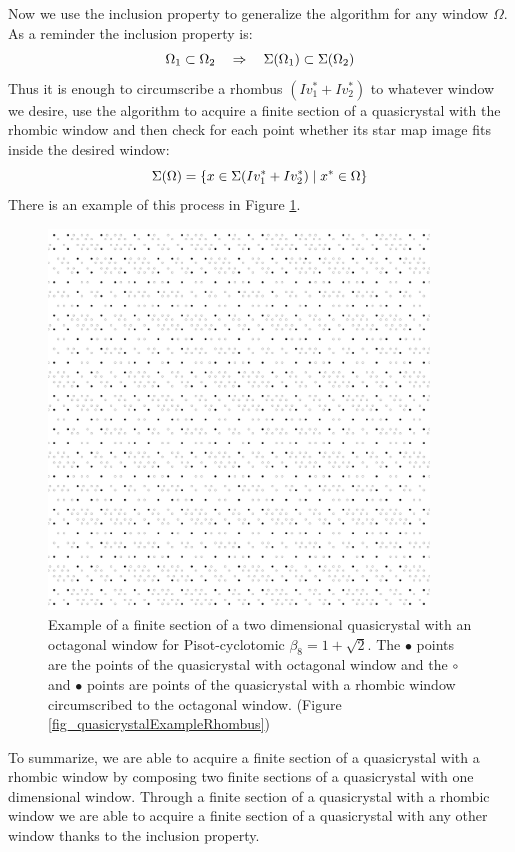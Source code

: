 \documentclass[text.tex]{subfiles}
\begin{document}
Now we use the inclusion property to generalize the algorithm for any window $\Omega$. As a reminder the inclusion property is: 
$$\Omega_1\subset\Omega_2 \quad\Rightarrow\quad \Sigma(\Omega_1)\subset\Sigma(\Omega_2)$$
Thus it is enough to circumscribe a rhombus $(Iv_1^\ast+Iv_2^\ast)$ to whatever window we desire, use the algorithm to acquire a finite section of a quasicrystal with the rhombic window and then check for each point whether its star map image fits inside the desired window: 
$$\Sigma(\Omega) = \{ x \in \Sigma(Iv_1^\ast+Iv_2^\ast)\; |\; x^\ast\in \Omega\}$$
There is an example of this process in Figure \ref{fig_quasicrystalExampleOctagon}. 

\begin{figure}[h!]
\centering
\includegraphics[width=0.9\textwidth]{img/2D/octagon}
\caption{Example of a finite section of a two dimensional quasicrystal with an octagonal window for Pisot-cyclotomic $\beta_8=1+\sqrt{2}$. The $\bullet$ points are the points of the quasicrystal with octagonal window and the $\circ$ and $\bullet$ points are points of the quasicrystal with a rhombic window circumscribed to the octagonal window. (Figure \ref{fig_quasicrystalExampleRhombus})}
\label{fig_quasicrystalExampleOctagon}
\end{figure}

To summarize, we are able to acquire a finite section of a quasicrystal with a rhombic window by composing two finite sections of a quasicrystal with one dimensional window. Through a finite section of a quasicrystal with a rhombic window we are able to acquire a finite section of a quasicrystal with any other window thanks to the inclusion property. 
\end{document}

